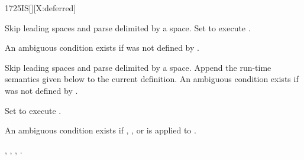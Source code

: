 \begin{worddef}{1725}{IS}[][X:deferred]
\interpret

	Skip leading spaces and parse  delimited by a space.
	Set  to execute .

	An ambiguous condition exists if  was not defined
	by .

\compile

	Skip leading spaces and parse  delimited by a space.
	Append the run-time semantics given below to the current definition.
	An ambiguous condition exists if  was not defined by
	.

\runtime

	Set  to execute .

	An ambiguous condition exists if , \word{[COMPILE]},
	\word{[']} or  is applied to .

\see {},
	,
	,
	.

	\begin{implement} %
		\word{:}  \\
		\tab {}   \\
		\tab[2]  \word{[']}   \\
		\tab {} \\
		\tab[2]   \\
		\tab {} \word{;} 
	\end{implement}

	\begin{testing} %
		 \\

		 \\

		 \\
	\end{testing}
\end{worddef}


